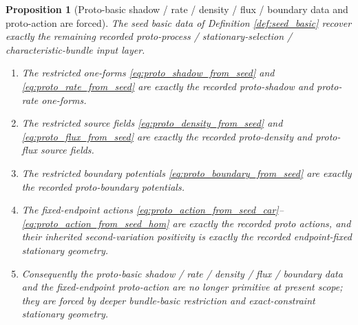 \documentclass[11pt]{article}
\newtheorem{proposition}{Proposition}
\begin{document}
\begin{proposition}[Proto-basic shadow / rate / density / flux / boundary data and proto-action are forced]
\label{prop:proto_basic_forced}
The seed basic data of Definition \ref{def:seed_basic} recover exactly the remaining recorded proto-process / stationary-selection / characteristic-bundle input layer.
\begin{enumerate}
    \item The restricted one-forms \eqref{eq:proto_shadow_from_seed} and \eqref{eq:proto_rate_from_seed} are exactly the recorded proto-shadow and proto-rate one-forms.
    \item The restricted source fields \eqref{eq:proto_density_from_seed} and \eqref{eq:proto_flux_from_seed} are exactly the recorded proto-density and proto-flux source fields.
    \item The restricted boundary potentials \eqref{eq:proto_boundary_from_seed} are exactly the recorded proto-boundary potentials.
    \item The fixed-endpoint actions \eqref{eq:proto_action_from_seed_car}--\eqref{eq:proto_action_from_seed_hom} are exactly the recorded proto actions, and their inherited second-variation positivity is exactly the recorded endpoint-fixed stationary geometry.
    \item Consequently the proto-basic shadow / rate / density / flux / boundary data and the fixed-endpoint proto-action are no longer primitive at present scope; they are forced by deeper bundle-basic restriction and exact-constraint stationary geometry.
\end{enumerate}
\end{proposition}
\end{document}
